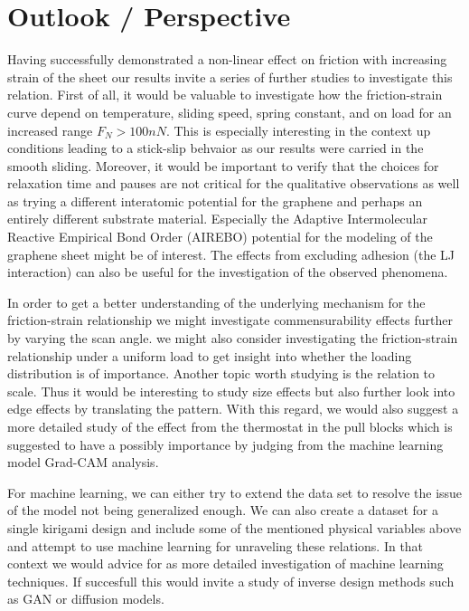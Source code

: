 \section{Outlook / Perspective}

Having successfully demonstrated a non-linear effect on friction with increasing
strain of the sheet our results invite a series of further studies to investigate this relation. First of all, it would be valuable to investigate how the friction-strain curve depend on temperature, sliding speed, spring constant, and on load for an increased range $F_N > 100 nN$. This is especially interesting in the context up conditions leading to a stick-slip behvaior as our results were carried in the smooth sliding. Moreover, it would be important to verify that the choices for relaxation time and pauses are not critical for the qualitative observations as well as trying a different
interatomic potential for the graphene and perhaps an entirely different
substrate material. Especially the Adaptive Intermolecular Reactive Empirical
Bond Order (AIREBO) potential for the modeling of the graphene sheet might be of interest. The effects from excluding adhesion (the \acrshort{LJ} interaction) can also be useful for the investigation of the observed phenomena. 


In order to get a better understanding of the underlying mechanism for the friction-strain relationship we might investigate commensurability effects further by varying the scan angle. we might also consider investigating the friction-strain relationship under a uniform load to get insight into whether the loading distribution is of importance. Another topic worth studying is the relation to scale. Thus it would be interesting to study size effects but also further look into edge effects by translating the pattern. With this regard, we would also suggest a more detailed study of the effect from the thermostat in the pull blocks which is suggested to have a possibly importance by judging from the machine learning model Grad-CAM analysis. 

For machine learning, we can either try to extend the data set to resolve the issue of the model not being generalized enough. We can also create a dataset for a single kirigami design and include some of the mentioned physical variables above and attempt to use machine learning for unraveling these relations. In that context we would advice for as more detailed investigation of machine learning techniques. If succesfull this would invite a study of inverse design methods such as GAN or diffusion models. 

